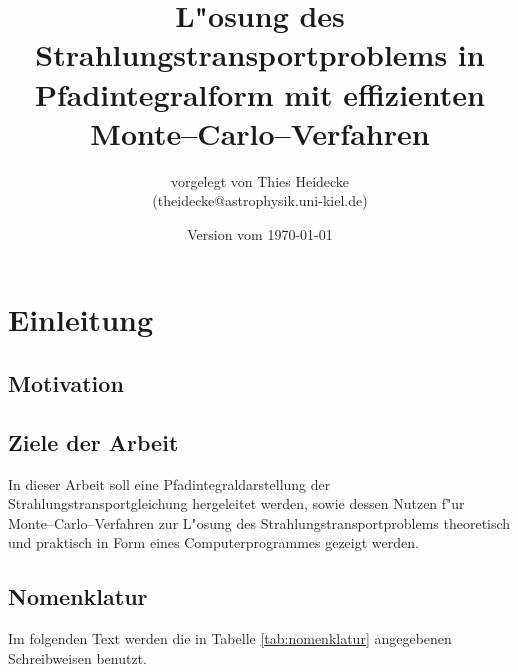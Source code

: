 \documentclass[11pt,a4paper,DIVcalc,BCOR8mm,titlepage,twoside]{scrartcl}
\begin{document}
	\titlehead{Christian--Albrechts--Universit"at zu Kiel\\ Institut f"ur Theoretische Physik und Astrophysik}
	\subject{Diplomarbeit}
	\title{L"osung des Strahlungstransportproblems in Pfadintegralform mit effizienten Monte--Carlo--Verfahren}
	\author{vorgelegt von Thies Heidecke\\(theidecke@astrophysik.uni-kiel.de)}
	\publishers{betreut durch Prof. Sebastian Wolf}
	\date{Version vom \today}
	\maketitle
	

	\tableofcontents
	\pagebreak
	
	\newcommand{\location}[1]{\mathbf{#1}}
	\newcommand{\scatter}[1]{\overset{#1}{\leftrightsquigarrow}}
	\newcommand{\normalized}[1]{\frac{#1}{||#1||}}
	
	\section{Einleitung}
	\subsection{Motivation}
	\subsection{Ziele der Arbeit}
	In dieser Arbeit soll eine Pfadintegraldarstellung der Strahlungstransportgleichung hergeleitet werden, sowie dessen Nutzen f"ur Monte--Carlo--Verfahren zur L"osung des Strahlungstransportproblems theoretisch und praktisch in Form eines Computerprogrammes gezeigt werden.
	
	\subsection{Nomenklatur}
	Im folgenden Text werden die in Tabelle \ref{tab:nomenklatur} angegebenen Schreibweisen benutzt.
\end{document}
